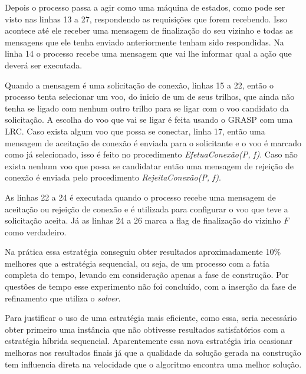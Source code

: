 Depois o processo passa a agir como uma máquina de estados, como pode ser visto
nas linhas 13 a 27, respondendo as requisições que forem recebendo. Isso
acontece até ele receber uma mensagem de finalização do seu vizinho e todas as mensagens
que ele tenha enviado anteriormente tenham sido respondidas. Na linha 14
o processo recebe uma mensagem que vai lhe informar qual a ação que deverá
ser executada.

Quando a mensagem é uma solicitação de conexão, linhas 15 a 22, então o processo
tenta selecionar um voo, do inicio de um de seus trilhos, que ainda não tenha se
ligado com nenhum outro trilho para se ligar com o voo candidato da solicitação.
A escolha do voo que vai se ligar é feita usando o GRASP com uma LRC. Caso
exista algum voo que possa se conectar, linha 17, então uma mensagem de
aceitação de conexão é enviada para o solicitante e o voo é marcado como já
selecionado, isso é feito no procedimento \textit{EfetuaConexão(P, f)}. Caso
não exista nenhum voo que possa se candidatar então uma mensagem de rejeição de
conexão é enviada pelo procedimento \textit{RejeitaConexão(P, f)}.

As linhas 22 a 24 é executada quando o processo recebe uma mensagem de aceitação
ou rejeição de conexão e é utilizada para configurar o voo que teve a
solicitação aceita. Já as linhas 24 a 26 marca a flag de finalização do vizinho
$F$ como verdadeiro.

Na prática essa estratégia conseguiu obter resultados aproximadamente 10\%
melhores que a estratégia sequencial, ou seja, de um processo com a fatia
completa do tempo, levando em consideração apenas a fase de construção. Por
questões de tempo esse experimento não foi concluído, com a inserção da fase de
refinamento que utiliza o \textit{solver}.

Para justificar o uso de uma estratégia mais eficiente, como essa, seria
necessário obter primeiro uma instância que não obtivesse resultados
satisfatórios com a estratégia híbrida sequencial. Aparentemente essa nova
estratégia iria ocasionar melhoras nos resultados finais já que a qualidade da
solução gerada na construção tem influencia direta na velocidade que o
algoritmo encontra uma melhor solução.




 
 